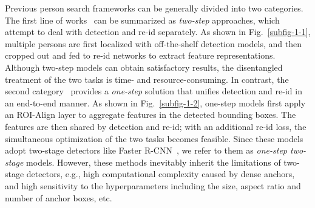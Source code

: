 \documentclass[journal]{IEEEtran}
\begin{document}
Previous person search frameworks can be generally divided into two categories. The first line of works~\cite{DBLP:conf/cvpr/ZhengZSCYT17,DBLP:conf/eccv/ChenZOYT18,DBLP:conf/eccv/LanZG18} can be summarized as \emph{two-step} approaches, which attempt to deal with detection and re-id separately. As shown in Fig.~\ref{subfig-1-1}, multiple persons are first localized with off-the-shelf detection models, and then cropped out and fed to re-id networks to extract feature representations. Although two-step models can obtain satisfactory results, the disentangled treatment of the two tasks is time- and resource-consuming.
In contrast, the second category~\cite{DBLP:conf/cvpr/XiaoLWLW17,DBLP:conf/iccv/LiuFJKZQJY17,DBLP:conf/eccv/ChangHSLYH18,DBLP:conf/cvpr/MunjalATG19,DBLP:conf/cvpr/ChenZYS20} provides a \emph{one-step} solution that unifies detection and re-id in an end-to-end manner.
As shown in Fig.~\ref{subfig-1-2}, one-step models first apply an ROI-Align layer to aggregate features in the detected bounding boxes. The features are then shared by detection and re-id; with an additional re-id loss, the simultaneous optimization of the two tasks becomes feasible. Since these models adopt two-stage detectors like Faster R-CNN~\cite{DBLP:journals/pami/RenHG017}, we refer to them as \emph{one-step two-stage} models. However, these methods inevitably inherit the limitations of two-stage detectors, e.g., high computational complexity caused by dense anchors, and high sensitivity to the hyperparameters including the size, aspect ratio and number of anchor boxes, etc.
\end{document}
